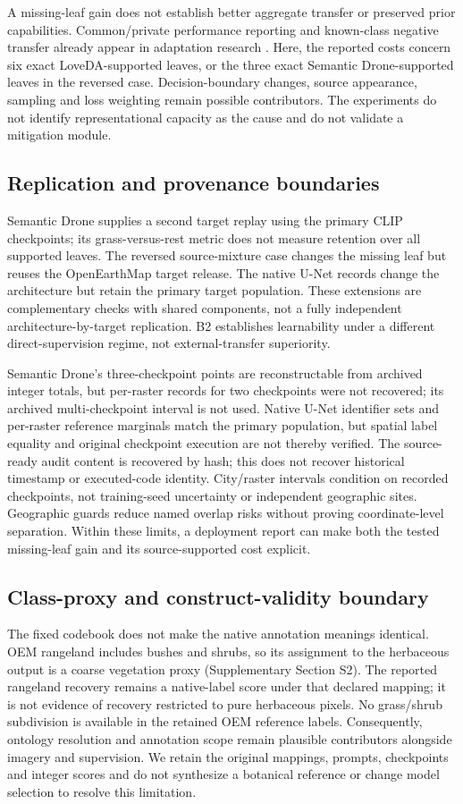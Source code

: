 A missing-leaf gain does not establish better aggregate transfer or preserved prior capabilities. Common/private performance reporting and known-class negative transfer already appear in adaptation research \citep{choe2024bus,choe2025unida,ren2026sats}. Here, the reported costs concern six exact LoveDA-supported leaves, or the three exact Semantic Drone-supported leaves in the reversed case. Decision-boundary changes, source appearance, sampling and loss weighting remain possible contributors. The experiments do not identify representational capacity as the cause and do not validate a mitigation module.

\subsection{Replication and provenance boundaries}
Semantic Drone supplies a second target replay using the primary CLIP checkpoints; its grass-versus-rest metric does not measure retention over all supported leaves. The reversed source-mixture case changes the missing leaf but reuses the OpenEarthMap target release. The native U-Net records change the architecture but retain the primary target population. These extensions are complementary checks with shared components, not a fully independent architecture-by-target replication. B2 establishes learnability under a different direct-supervision regime, not external-transfer superiority.

Semantic Drone's three-checkpoint points are reconstructable from archived integer totals, but per-raster records for two checkpoints were not recovered; its archived multi-checkpoint interval is not used. Native U-Net identifier sets and per-raster reference marginals match the primary population, but spatial label equality and original checkpoint execution are not thereby verified. The source-ready audit content is recovered by hash; this does not recover historical timestamp or executed-code identity. City/raster intervals condition on recorded checkpoints, not training-seed uncertainty or independent geographic sites. Geographic guards reduce named overlap risks without proving coordinate-level separation. Within these limits, a deployment report can make both the tested missing-leaf gain and its source-supported cost explicit.


\subsection{Class-proxy and construct-validity boundary}
The fixed codebook does not make the native annotation meanings identical. OEM rangeland includes bushes and shrubs, so its assignment to the herbaceous output is a coarse vegetation proxy (Supplementary Section S2). The reported rangeland recovery remains a native-label score under that declared mapping; it is not evidence of recovery restricted to pure herbaceous pixels. No grass/shrub subdivision is available in the retained OEM reference labels. Consequently, ontology resolution and annotation scope remain plausible contributors alongside imagery and supervision. We retain the original mappings, prompts, checkpoints and integer scores and do not synthesize a botanical reference or change model selection to resolve this limitation.
